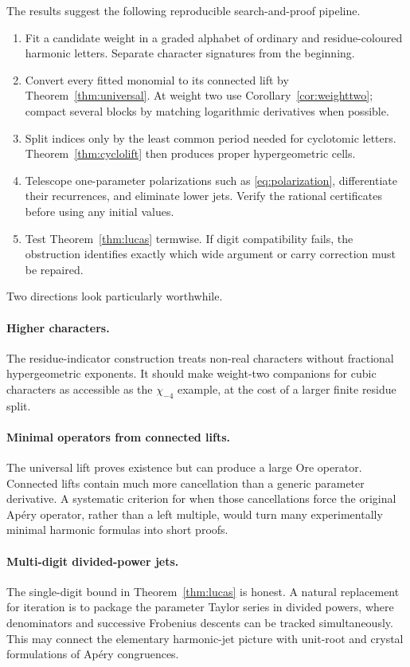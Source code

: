 \documentclass[11pt]{article}
\theoremstyle{definition}
\theoremstyle{remark}
\begin{document}
The results suggest the following reproducible search-and-proof pipeline.
\begin{enumerate}[leftmargin=2em]
\item Fit a candidate weight in a graded alphabet of ordinary and residue-coloured
  harmonic letters.  Separate character signatures from the beginning.
\item Convert every fitted monomial to its connected lift by
  Theorem~\ref{thm:universal}.  At weight two use Corollary~\ref{cor:weighttwo}; compact
  several blocks by matching logarithmic derivatives when possible.
\item Split indices only by the least common period needed for cyclotomic letters.
  Theorem~\ref{thm:cyclolift} then produces proper hypergeometric cells.
\item Telescope one-parameter polarizations such as \eqref{eq:polarization}, differentiate
  their recurrences, and eliminate lower jets.  Verify the rational certificates before
  using any initial values.
\item Test Theorem~\ref{thm:lucas} termwise.  If digit compatibility fails, the obstruction
  identifies exactly which wide argument or carry correction must be repaired.
\end{enumerate}

Two directions look particularly worthwhile.

\paragraph{Higher characters.}
The residue-indicator construction treats non-real characters without fractional
hypergeometric exponents.  It should make weight-two companions for cubic characters as
accessible as the $\chi_{-4}$ example, at the cost of a larger finite residue split.

\paragraph{Minimal operators from connected lifts.}
The universal lift proves existence but can produce a large Ore operator.  Connected
lifts contain much more cancellation than a generic parameter derivative.  A systematic
criterion for when those cancellations force the original Ap\'ery operator, rather than
a left multiple, would turn many experimentally minimal harmonic formulas into short
proofs.

\paragraph{Multi-digit divided-power jets.}
The single-digit bound in Theorem~\ref{thm:lucas} is honest.  A natural replacement for
iteration is to package the parameter Taylor series in divided powers, where denominators
and successive Frobenius descents can be tracked simultaneously.  This may connect the
elementary harmonic-jet picture with unit-root and crystal formulations of Ap\'ery
congruences.
\end{document}
